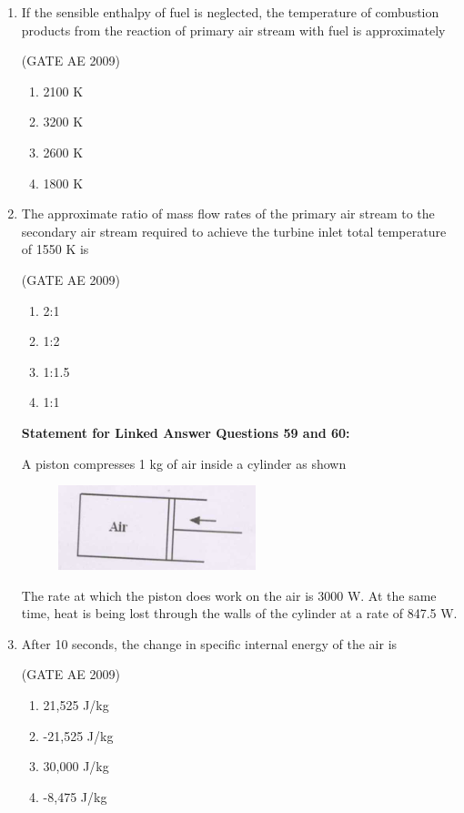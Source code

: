 \documentclass[journal,12pt,onecolumn]{IEEEtran}
\theoremstyle{remark}
\begin{document}
\begin{flushleft}
\begin{enumerate}
\item If the sensible enthalpy of fuel is neglected, the temperature of combustion products from the reaction of primary air stream with fuel is approximately

\hfill(GATE AE 2009)

\begin{enumerate}
\item 2100 K
\item 3200 K
\item 2600 K
\item 1800 K
\end{enumerate}

\item The approximate ratio of mass flow rates of the primary air stream to the secondary air stream required to achieve the turbine inlet total temperature of 1550 K is

\hfill(GATE AE 2009)

\begin{enumerate}
\item 2:1
\item 1:2
\item 1:1.5
\item 1:1
\end{enumerate}

\textbf{Statement for Linked Answer Questions 59 and 60:}

A piston compresses 1 kg of air inside a cylinder as shown

\begin{figure}[H]
    \centering
    \includegraphics[width=0.5\columnwidth]{figs/img.png}
    \caption{}
    \label{fig:placeholder}
\end{figure}
The rate at which the piston does work on the air is 3000 W. At the same time, heat is being lost through the walls of the cylinder at a rate of 847.5 W.

\item After 10 seconds, the change in specific internal energy of the air is

\hfill(GATE AE 2009)

\begin{enumerate}
\item 21,525 J/kg
\item -21,525 J/kg
\item 30,000 J/kg
\item -8,475 J/kg
\end{enumerate}


\end{enumerate}
\end{flushleft}
\end{document}

